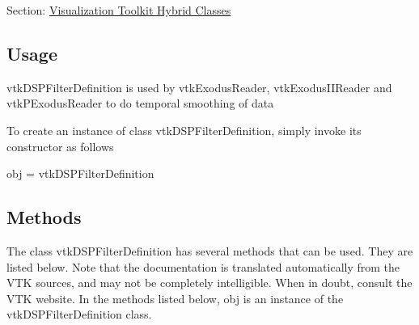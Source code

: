 Section\-: \hyperlink{sec_vtkhybrid}{Visualization Toolkit Hybrid Classes} \hypertarget{vtkwidgets_vtkxyplotwidget_Usage}{}\subsection{Usage}\label{vtkwidgets_vtkxyplotwidget_Usage}
vtk\-D\-S\-P\-Filter\-Definition is used by vtk\-Exodus\-Reader, vtk\-Exodus\-I\-I\-Reader and vtk\-P\-Exodus\-Reader to do temporal smoothing of data

To create an instance of class vtk\-D\-S\-P\-Filter\-Definition, simply invoke its constructor as follows \begin{DoxyVerb}  obj = vtkDSPFilterDefinition
\end{DoxyVerb}
 \hypertarget{vtkwidgets_vtkxyplotwidget_Methods}{}\subsection{Methods}\label{vtkwidgets_vtkxyplotwidget_Methods}
The class vtk\-D\-S\-P\-Filter\-Definition has several methods that can be used. They are listed below. Note that the documentation is translated automatically from the V\-T\-K sources, and may not be completely intelligible. When in doubt, consult the V\-T\-K website. In the methods listed below, {\ttfamily obj} is an instance of the vtk\-D\-S\-P\-Filter\-Definition class. 
